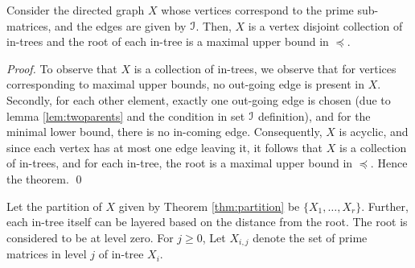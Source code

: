 \documentclass[a4paper,UKenglish,numberwithinsect]{lipics}
\def\cI{{\cal I}}
\begin{document}
\begin{theorem} \label{thm:partition} Consider the directed graph $X$
  whose vertices correspond to the prime sub-matrices, and the edges
  are given by $\cI$.  Then, $X$ is a vertex disjoint collection of
  in-trees and the root of each in-tree is a maximal upper bound in
  $\preccurlyeq$.
\end{theorem}
\begin{proof}
To observe that $X$ is a collection of in-trees, we observe that for         
vertices corresponding to maximal upper bounds, no out-going edge is
present in $X$.  Secondly, for each other element, exactly one
out-going edge is chosen (due to lemma \ref{lem:twoparents} and the
condition in set $\cI$ definition), and for the 
minimal lower bound, there is no in-coming edge.  Consequently, $X$ is
acyclic, and since each vertex has at most one edge leaving it, it
follows that $X$ is a collection of in-trees, and for each in-tree,
the root is a maximal upper bound in $\preccurlyeq$.  Hence the
theorem. 
\qed
\end{proof}

\noindent
Let the partition of $X$ given by Theorem \ref{thm:partition} be
$\{X_1,\ldots,X_r\}$.  Further, each in-tree itself  
can be layered based on the distance from the root.  The root is
considered to be at level zero. For $j \geq 0$, Let $X_{i,j}$ denote
the set of prime matrices in level $j$ of in-tree $X_i$.   
\end{document}
